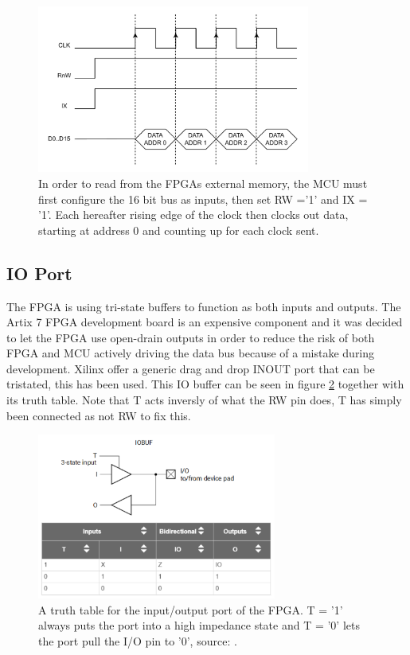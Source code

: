 \begin{figure}[H]
    \centering
    \includegraphics[clip, trim=0 0 0 0, width=0.8\textwidth]{Sections/7_SystemDesign/Figures/MCU_IX_FETCH.pdf}
    \caption{In order to read from the FPGAs external memory, the MCU must first configure the 16 bit bus as inputs, then set RW ='1' and IX = '1'. Each hereafter rising edge of the clock then clocks out data, starting at address 0 and counting up for each clock sent.}
    \label{fig_7_2_1_CommRead_IX}
\end{figure}

\subsection*{IO Port}
The FPGA is using tri-state buffers to function as both inputs and outputs. The Artix 7 FPGA development board is an expensive component and it was decided to let the FPGA use open-drain outputs in order to reduce the risk of both FPGA and MCU actively driving the data bus because of a mistake during development. Xilinx offer a generic drag and drop INOUT port that can be tristated, this has been used. This IO buffer can be seen in figure \ref{fig_7_2_1_IOBUF} together with its truth table. Note that T acts inversly of what the RW pin does, T has simply been connected as not RW to fix this.

\begin{figure}[H]
    \centering
    \includegraphics[clip, trim=0 0 0 0, width=0.7\textwidth]{Sections/7_SystemDesign/Figures/IOBUF.pdf}
    \caption{A truth table for the input/output port of the FPGA. T = '1' always puts the port into a high impedance state and T = '0' lets the port pull the I/O pin to '0', source: \cite{Xilinx_IOBUF}.}
    \label{fig_7_2_1_IOBUF}
\end{figure}

